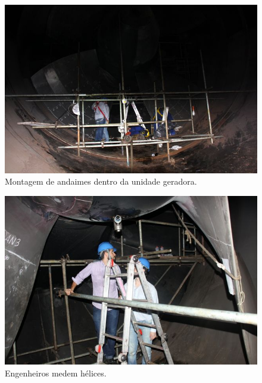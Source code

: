 \documentclass[a4paper,11pt,oneside,openany,brazilian,
version=last,draft=false,]{report}
\begin{document}
\begin{twocolumn}






\begin{figure}[H]
\centering
\includegraphics[width=\columnwidth]{Fotos/img_4931.jpg}
\caption{Montagem de andaimes dentro da unidade geradora.}
\end{figure}

\begin{figure}[H]
\centering
\includegraphics[width=\columnwidth]{Fotos/img_4966.jpg}
\caption{Engenheiros medem hélices.}
\end{figure}


\end{twocolumn}
\end{document}
